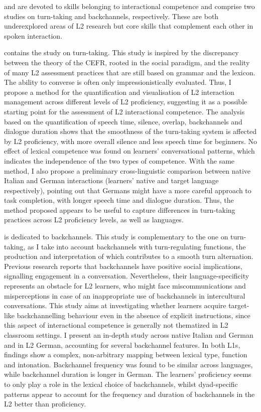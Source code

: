  and  are devoted to skills belonging to interactional competence and comprise two studies on turn-taking and backchannels, respectively. These are both underexplored areas of L2 research but core skills that complement each other in spoken interaction.

 contains the study on turn-taking. This study is inspired by the discrepancy between the theory of the CEFR, rooted in the social paradigm, and the reality of many L2 assessment practices that are still based on grammar and the lexicon. The ability to converse is often only impressionistically evaluated. Thus, I propose a method for the quantification and visualisation of L2 interaction management across different levels of L2 proficiency, suggesting it as a possible starting point for the assessment of L2 interactional competence. The analysis based on the quantification of speech time, silence, overlap, backchannels and dialogue duration shows that the smoothness of the turn-taking system is affected by L2 proficiency, with more overall silence and less speech time for beginners. No effect of lexical competence was found on learners’ conversational patterns, which indicates the independence of the two types of competence. With the same method, I also propose a preliminary cross-linguistic comparison between native Italian and German interactions (learners’ native and target language respectively), pointing out that Germans might have a more careful approach to task completion, with longer speech time and dialogue duration. Thus, the method proposed appears to be useful to capture differences in turn-taking practices across L2 proficiency levels, as well as languages.

 is dedicated to backchannels. This study is complementary to the one on turn-taking, as I take into account backchannels with turn-regulating functions, the production and interpretation of which contributes to a smooth turn alternation. Previous research reports that backchannels have positive social implications, signalling engagement in a conversation. Nevertheless, their language-specificity represents an obstacle for L2 learners, who might face miscommunications and misperceptions in case of an inappropriate use of backchannels in intercultural conversations. This study aims at investigating whether learners acquire target-like backchannelling behaviour even in the absence of explicit instructions, since this aspect of interactional competence is generally not thematized in L2 classroom settings. I present an in-depth study across native Italian and German and in L2 German, accounting for several backchannel features. In both L1s, findings show a complex, non-arbitrary mapping between lexical type, function and intonation. Backchannel frequency was found to be similar across languages, while backchannel duration is longer in German. The learners’ proficiency seems to only play a role in the lexical choice of backchannels, whilst dyad-specific patterns appear to account for the frequency and duration of backchannels in the L2 better than proficiency.

